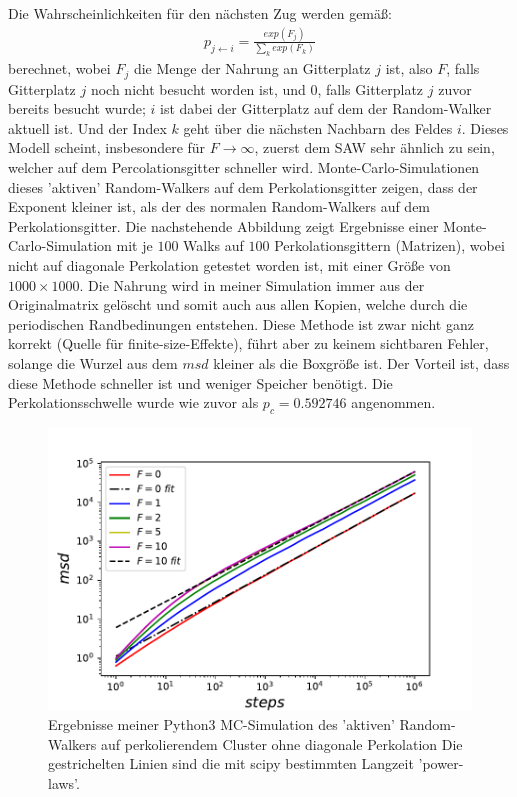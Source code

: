 \documentclass[a4paper, 12pt]{report}
\begin{document}
\noindent Die Wahrscheinlichkeiten für den nächsten Zug werden gemäß:
\begin{align}
p_{j \leftarrow i} = \frac{exp({F_j})}{\sum_k exp({F_k})}
\end{align}
berechnet, wobei $F_j$ die Menge der Nahrung an Gitterplatz $j$ ist, also $F$, falls Gitterplatz $j$ noch nicht besucht worden ist, und $0$, falls Gitterplatz $j$ zuvor bereits besucht wurde; $i$ ist dabei der Gitterplatz auf dem der Random-Walker aktuell ist. Und der Index $k$ geht über die nächsten Nachbarn des Feldes $i$. Dieses Modell scheint, insbesondere für $F \rightarrow \infty$, zuerst dem SAW sehr ähnlich zu sein, welcher auf dem Percolationsgitter schneller wird. Monte-Carlo-Simulationen dieses 'aktiven' Random-Walkers auf dem Perkolationsgitter zeigen, dass der Exponent kleiner ist, als der des normalen Random-Walkers auf dem Perkolationsgitter. Die nachstehende Abbildung zeigt Ergebnisse einer Monte-Carlo-Simulation mit je $100$ Walks auf $100$ Perkolationsgittern (Matrizen), wobei nicht auf diagonale Perkolation getestet worden ist, mit einer Größe von $1000 \times 1000$. Die Nahrung wird in meiner Simulation immer aus der Originalmatrix gelöscht und somit auch aus allen Kopien, welche durch die periodischen Randbedinungen entstehen. Diese Methode ist zwar nicht ganz korrekt (Quelle für finite-size-Effekte), führt aber zu keinem sichtbaren Fehler, solange die Wurzel aus dem $msd$ kleiner als die Boxgröße ist. Der Vorteil ist, dass diese Methode schneller ist und weniger Speicher benötigt. Die Perkolationsschwelle wurde wie zuvor als $p_c=0.592746$ angenommen.
\begin{figure}[h!]
	\centering
	\includegraphics[scale=0.9]{food.pdf}
	\caption{Ergebnisse meiner Python3 MC-Simulation des 'aktiven' Random-Walkers auf perkolierendem Cluster ohne diagonale Perkolation \break Die gestrichelten Linien sind die mit scipy bestimmten Langzeit 'power-laws'.}
\end{figure}
\newpage
\end{document}
